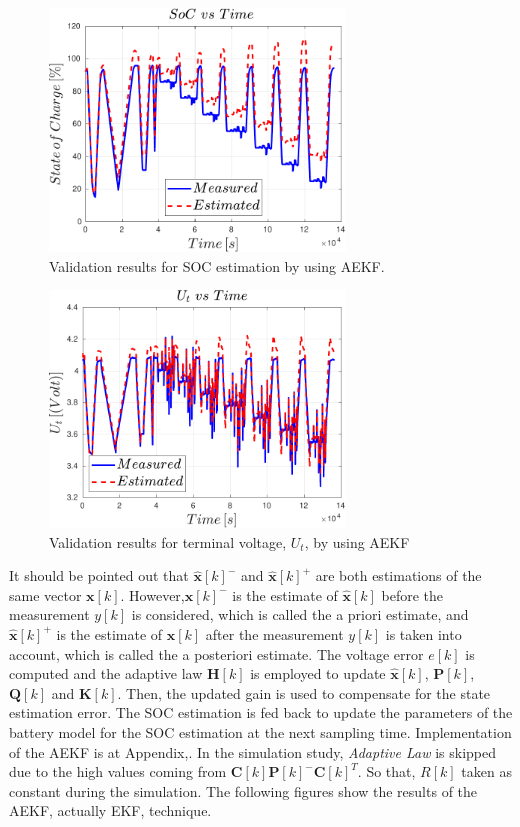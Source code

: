 \documentclass[12pt]{article}
\begin{document}
\begin{figure}[t!]
	\centering
	\includegraphics[width=0.7\textwidth, keepaspectratio]{images/AEKF_SOC.pdf}
	\caption{Validation results for SOC estimation by using AEKF.}
	\label{fig:The_AEKF_SOC}
\end{figure}

\begin{figure}[b!]
	\centering
	\includegraphics[width=0.7\textwidth, keepaspectratio]{images/AEKF_Terminal_Voltage.pdf}
	\caption{Validation results for terminal voltage, $U_{t}$, by using AEKF}
	\label{fig:The_AEKF_Terminal_Voltage}
\end{figure}

\par \noindent It should be pointed out that $\bm{\hat{x}}[k]^{-}$ and $\bm{\hat{x}}[k]^{+}$ are both estimations of the same vector $\bm{x}[k]$. However,$\bm{\hat{x}}[k]^{-}$ is the estimate of $\bm{\hat{x}}[k]$ before the measurement $y[k]$ is considered, which is called the a priori estimate, and $\bm{\hat{x}}[k]^{+}$ is the estimate of $\bm{x}[k]$ after the measurement $y[k]$ is taken into account, which is called the a posteriori estimate.  The voltage error $e[k]$ is computed and the adaptive law $\bm{H}[k]$ is employed to update $\bm{\hat{x}}[k]$, $\bm{P}[k]$, $\bm{Q}[k]$ and $\bm{K}[k]$. Then, the updated gain is used to
compensate for the state estimation error. The SOC estimation is fed back to update the parameters of the battery model for the SOC estimation at the next sampling time. Implementation of the AEKF is at Appendix,. In the simulation study, \textit{Adaptive Law} is skipped due to the high values coming from $\bm{C}[k]\bm{P}[k]^{-}\bm{C}[k]^{T}$. So that, $R[k]$ taken as constant during the simulation. The following figures show the results of the AEKF, actually EKF, technique. 
\end{document}
